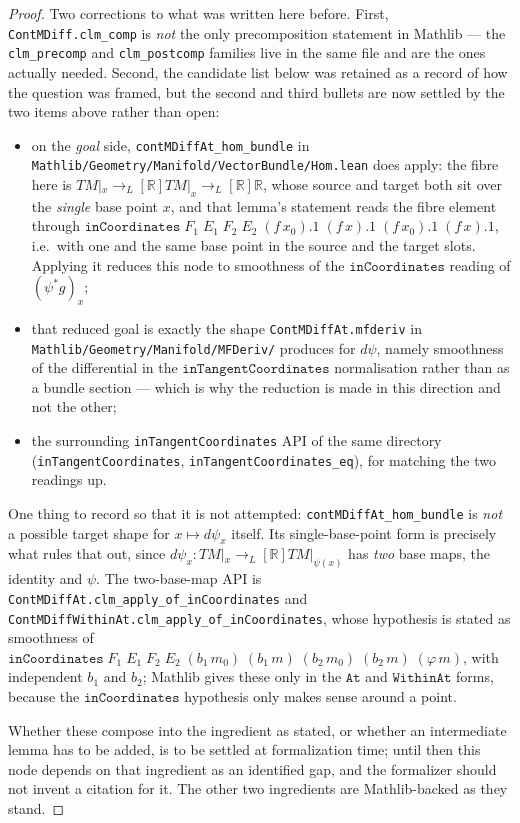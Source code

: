 \begin{proof}
    Two corrections to what was written here before. First, \texttt{ContMDiff.clm\_comp} is \emph{not} the only precomposition statement in Mathlib --- the \texttt{clm\_precomp} and \texttt{clm\_postcomp} families live in the same file and are the ones actually needed. Second, the candidate list below was retained as a record of how the question was framed, but the second and third bullets are now settled by the two items above rather than open:
    \begin{itemize}
        \item on the \emph{goal} side, \texttt{contMDiffAt\_hom\_bundle} in \texttt{Mathlib/Geometry/Manifold/VectorBundle/Hom.lean} does apply: the fibre here is $TM|_x \to_L[\mathbb{R}] TM|_x \to_L[\mathbb{R}] \mathbb{R}$, whose source and target both sit over the \emph{single} base point $x$, and that lemma's statement reads the fibre element through $\mathtt{inCoordinates}\;F_1\;E_1\;F_2\;E_2\;(f\,x_0).1\;(f\,x).1\;(f\,x_0).1\;(f\,x).1$, i.e.\ with one and the same base point in the source and the target slots. Applying it reduces this node to smoothness of the $\mathtt{inCoordinates}$ reading of $(\psi^*g)_x$;
        \item that reduced goal is exactly the shape \texttt{ContMDiffAt.mfderiv} in \texttt{Mathlib/Geometry/Manifold/MFDeriv/} produces for $d\psi$, namely smoothness of the differential in the $\mathtt{inTangentCoordinates}$ normalisation rather than as a bundle section --- which is why the reduction is made in this direction and not the other;
        \item the surrounding \texttt{inTangentCoordinates} API of the same directory (\texttt{inTangentCoordinates}, \texttt{inTangentCoordinates\_eq}), for matching the two readings up.
    \end{itemize}
    One thing to record so that it is not attempted: \texttt{contMDiffAt\_hom\_bundle} is \emph{not} a possible target shape for $x \mapsto d\psi_x$ itself. Its single-base-point form is precisely what rules that out, since $d\psi_x : TM|_x \to_L[\mathbb{R}] TM|_{\psi(x)}$ has \emph{two} base maps, the identity and $\psi$. The two-base-map API is \texttt{ContMDiffAt.clm\_apply\_of\_inCoordinates} and \texttt{ContMDiffWithinAt.clm\_apply\_of\_inCoordinates}, whose hypothesis is stated as smoothness of $\mathtt{inCoordinates}\;F_1\;E_1\;F_2\;E_2\;(b_1\,m_0)\;(b_1\,m)\;(b_2\,m_0)\;(b_2\,m)\;(\varphi\,m)$, with independent $b_1$ and $b_2$; Mathlib gives these only in the $\mathtt{At}$ and $\mathtt{WithinAt}$ forms, because the $\mathtt{inCoordinates}$ hypothesis only makes sense around a point.

    Whether these compose into the ingredient as stated, or whether an intermediate lemma has to be added, is to be settled at formalization time; until then this node depends on that ingredient as an identified gap, and the formalizer should not invent a citation for it. The other two ingredients are Mathlib-backed as they stand.
\end{proof}

